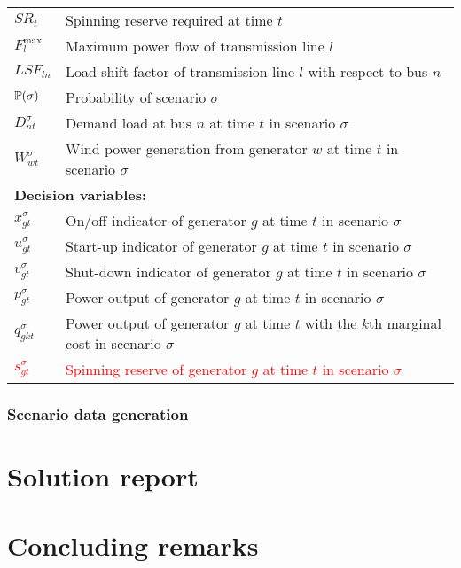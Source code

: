 \begin{table}[H]
\begin{tabular}{ll}
		$SR_t$ & Spinning reserve required at time $t$ \\
		$F^\text{max}_l$ & Maximum power flow of transmission line $l$ \\
		$LSF_{ln}$ & Load-shift factor of transmission line $l$ with respect to bus $n$ \\
		$\operatorname*{\mathbb{P}}(\sigma)$ & Probability of scenario $\sigma$ \\
		$D_{nt}^\sigma$ & Demand load at bus $n$ at time $t$ in scenario $\sigma$ \\
		$W_{wt}^\sigma$ & Wind power generation from generator $w$ at time $t$ in scenario $\sigma$ \\ \midrule
		\multicolumn{2}{l}{\textbf{Decision variables:}} \\
		$x_{gt}^\sigma$ & On/off indicator of generator $g$ at time $t$ in scenario $\sigma$\\
		$u_{gt}^\sigma $ & Start-up indicator of generator $g$ at time $t$ in scenario $\sigma$\\
		$v_{gt}^\sigma $ & Shut-down indicator of generator $g$ at time $t$ in scenario $\sigma$ \\
		$p_{gt}^\sigma$ & Power output of generator $g$ at time $t$ in scenario $\sigma$ \\
		$q_{gkt}^\sigma$ & Power output of generator $g$ at time $t$ with the $k$th marginal cost in scenario $\sigma$\\
		\textcolor{red}{$s_{gt}^\sigma$} & \textcolor{red}{Spinning reserve of generator $g$ at time $t$ in scenario $\sigma$} \\
		\hline
	\end{tabular}
\end{table}


\subsubsection{Scenario data generation}




\section{Solution report}


\section{Concluding remarks}


